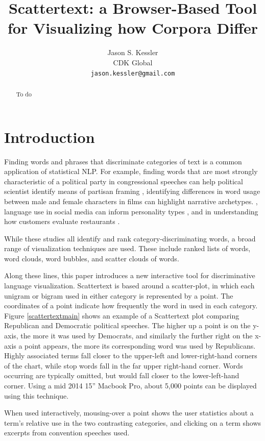 \documentclass[11pt]{article}
\title{Scattertext: a Browser-Based Tool for Visualizing how Corpora Differ}
\author{Jason S. Kessler \\
  CDK Global \\
  {\tt jason.kessler@gmail.com}  \\}
\date{}
\begin{document}
\maketitle
\begin{abstract}
  To do
\end{abstract}

\section{Introduction}
Finding words and phrases that discriminate categories of text is a common application of statistical NLP. For example, finding words that are most strongly characteristic of a political party in congressional speeches can help political scientist identify means of partisan framing \cite{monroe08,grimmer2010}, identifying differences in word usage between male and female characters in films can highlight narrative archetypes. \cite{schofield2016gender}, language use in social media can inform personality types \cite{Schwartz13}, and in understanding how customers evaluate restaurants \cite{jurafsky2014}.

While these studies all identify and rank category-discriminating words, a broad range of visualization techniques are used.  These include ranked lists of words, word clouds, word bubbles, and scatter clouds of words. 

Along these lines, this paper introduces a new interactive tool for discriminative language visualization.  Scattertext is based around a scatter-plot, in which each unigram or bigram used in either category is represented by a point. The coordinates of a point indicate how frequently the word in used in each category.  Figure \ref{scattertextmain} shows an example of a Scattertext plot comparing Republican and Democratic political speeches.  The higher up a point is on the y-axis, the more it was used by Democrats, and similarly the further right on the x-axis a point appears, the more its corresponding word was used by Republicans.  Highly associated terms fall closer to the upper-left and lower-right-hand corners of the chart, while stop words fall in the far upper right-hand corner.  Words occurring are typically omitted, but would fall closer to the lower-left-hand corner.  Using a mid 2014 15'' Macbook Pro, about 5,000 points can be displayed using this technique.

When used interactively, mousing-over a point shows the user statistics about a term's relative use in the two contrasting categories, and clicking on a term shows excerpts from convention speeches used.  
\end{document}
